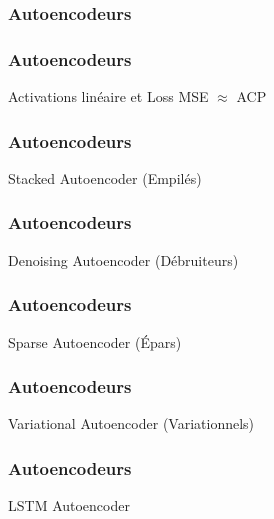 \begin{frame}
  \frametitle{Autoencodeurs}
\end{frame}

\begin{frame}
  \frametitle{Autoencodeurs}
  Activations linéaire et Loss MSE $\approx$ ACP
\end{frame}

\begin{frame}
  \frametitle{Autoencodeurs}
  Stacked Autoencoder (Empilés)
\end{frame}

\begin{frame}
  \frametitle{Autoencodeurs}
  Denoising Autoencoder (Débruiteurs)
\end{frame}

\begin{frame}
  \frametitle{Autoencodeurs}
  Sparse Autoencoder (Épars)
\end{frame}

\begin{frame}
  \frametitle{Autoencodeurs}
  Variational Autoencoder (Variationnels)
\end{frame}

\begin{frame}
  \frametitle{Autoencodeurs}
  LSTM Autoencoder
\end{frame}
